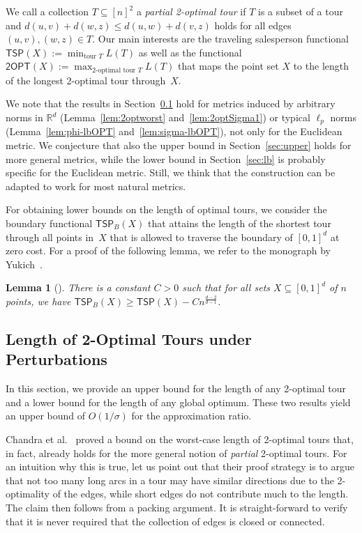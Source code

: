 \documentclass[11pt,DIV=12,a4paper]{scrartcl}
\newtheorem{lemma}[claim]{Lemma}
\newcommand{\real}{\ensuremath{\mathbb{R}}}
\newcommand{\bTSP}{\mathsf{TSP}_B}
\newcommand{\TSP}{\mathsf{TSP}}
\newcommand{\TwoOPT}{\mathsf{2OPT}}
\begin{document}
We call a collection $T \subseteq [n]^2$ a \emph{partial 2-optimal tour} if $T$ is a subset of a tour and $d(u,v) + d(w,z) \le d(u,w) + d(v,z)$ holds
for all edges $(u,v), (w,z) \in T$.
Our main interests are the traveling salesperson functional $\TSP(X) := \min_{\text{tour $T$}} L(T)$ as well as the functional $\TwoOPT(X):= \max_{\text{2-optimal tour $T$}} L(T)$ 
that maps the point set $X$ to the length of the longest 2-optimal tour through~$X$. 


We note that the results in Section~\ref{sec:length} hold for metrics induced by arbitrary norms in $\real^d$ (Lemma~\ref{lem:2optworst} and~\ref{lem:2optSigma1}) or typical $\ell_p$ norms (Lemma~\ref{lem:phi-lbOPT} and~\ref{lem:sigma-lbOPT}), not only for the Euclidean metric.
We conjecture that also the upper bound in Section~\ref{sec:upper} holds for more general metrics, while the lower bound
in Section~\ref{sec:lb} is probably specific for the Euclidean metric. Still, we think that
the construction can be adapted to work for most natural metrics.


For obtaining lower bounds on the length of optimal tours, we consider the boundary functional $\bTSP(X)$ that attains the length of the shortest tour through all points in~$X$ that is allowed to traverse the boundary of $[0,1]^d$ at zero cost. For a proof of the following lemma, we refer to the monograph by Yukich~\cite{Yukich:ProbEuclidean:1998}.

\begin{lemma}[]\label{lem:boundary}
There is a constant $C > 0$ such that for all sets $X \subseteq [0,1]^d$ of $n$ points, we have $\bTSP(X) \ge \TSP(X) - C n^{\frac{d-2}{d-1}}$.
\end{lemma}



\subsection{Length of 2-Optimal Tours under Perturbations}
\label{sec:length}

In this section, we provide an upper bound for the length of any 2-optimal tour and a lower bound for the length of any global optimum. These
two results yield an upper bound of $O(1/\sigma)$ for the approximation ratio.

Chandra et al.~\cite{ChandraEA:OldOpt:1999}  proved a bound on the worst-case length of 2-optimal tours that, in fact, already holds for the more general notion of \emph{partial} 2-optimal tours. For an intuition why this is true, let us point out that their proof strategy is to argue that not too many long arcs in a tour may have similar directions due to the 2-optimality of the edges, while short edges do not contribute much to the length. The claim then follows from a packing argument. It is straight-forward to verify that it is never required that the collection of edges is closed or connected. %
\end{document}
